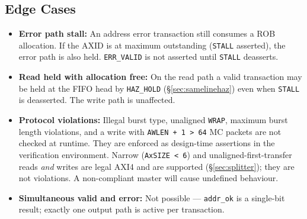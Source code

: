 \subsection{Edge Cases}

\begin{itemize}
  \item \textbf{Error path stall:} An address error transaction still
        consumes a ROB allocation. If the AXID is at maximum
        outstanding (\texttt{STALL} asserted), the error path is also
        held. \texttt{ERR\_VALID} is not asserted until \texttt{STALL}
        deasserts.
  \item \textbf{Read held with allocation free:} On the read path a valid
        transaction may be held at the FIFO head by \texttt{HAZ\_HOLD}
        (\S\ref{sec:samelinehaz}) even when \texttt{STALL} is deasserted.
        The write path is unaffected.
  \item \textbf{Protocol violations:} Illegal burst type, unaligned
        \texttt{WRAP}, maximum burst length violations, and a write with
        \texttt{AWLEN + 1 > 64} MC packets are not checked at runtime. They
        are enforced as design-time assertions in the verification
        environment. Narrow (\texttt{AxSIZE < 6}) and unaligned-first-transfer
        reads \emph{and} writes are legal AXI4 and are supported
        (\S\ref{sec:splitter}); they are not violations. A non-compliant
        master will cause undefined behaviour.
  \item \textbf{Simultaneous valid and error:} Not possible —
        \texttt{addr\_ok} is a single-bit result; exactly one output
        path is active per transaction.
\end{itemize}